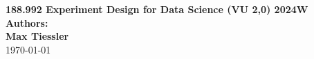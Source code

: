 \begin{titlepage}
    \centering
    \vspace*{4cm}
    
    {\Huge\textbf{188.992 Experiment Design for Data Science (VU 2,0) 2024W}}\\[0.5cm]
    
    \textbf{Authors:}\\[0.5cm]
    \textbf{Max Tiessler}\\[1.5cm]
    
    \vfill
    {\large \today}
    
    \vspace*{1cm}
\end{titlepage}
